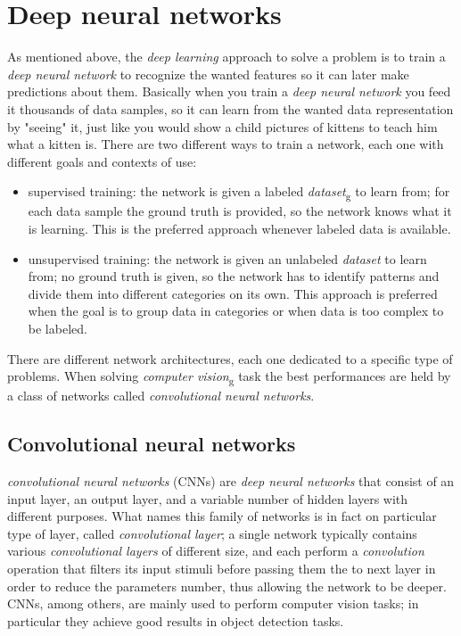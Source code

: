 \section{Deep neural networks}
	As mentioned above, the \emph{deep learning} approach to solve a problem is to train a \emph{deep neural network} to recognize the wanted features so it can later make predictions about them. Basically when you train a \emph{deep neural network} you feed it thousands of data samples, so it can learn from the wanted data representation by "seeing" it, just like you would show a child pictures of kittens to teach him what a kitten is.
	There are two different ways to train a network, each one with different goals and contexts of use:
	\begin{itemize}
		\item supervised training: the network is given a labeled \emph{\gls{dataset}}\textsubscript{g} to learn from; for each data sample the ground truth is provided, so the network knows what it is learning. This is the preferred approach whenever labeled data is available.
		\item unsupervised training: the network is given an unlabeled \emph{dataset} to learn from; no ground truth is given, so the network has to identify patterns and divide them into different categories on its own. This approach is preferred when the goal is to group data in categories or when data is too complex to be labeled.
	\end{itemize}
	There are different network architectures, each one dedicated to a specific type of problems. When solving  \emph{\gls{computer vision}}\textsubscript{g} task the best performances are held by a class of networks called \emph{convolutional neural networks}. \\

	\subsection{Convolutional neural networks}
	\emph{convolutional neural networks} (CNNs) are \emph{deep neural networks} that consist of an input layer, an output layer, and a variable number of hidden layers with different purposes. What names this family of networks is in fact on particular type of layer, called \emph{convolutional layer}; a single network typically contains various \emph{convolutional layers} of different size, and each perform a \emph{convolution} operation that filters its input stimuli before passing them the to next layer in order to reduce the parameters number, thus allowing the network to be deeper. \\
	CNNs, among others, are mainly used to perform computer vision tasks; in particular they achieve good results in object detection tasks. \\

